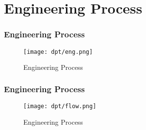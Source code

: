 \section{Engineering Process}

\begin{frame}
    \frametitle{Engineering Process}
    \begin{figure}
        \centering
        \texttt{[image: dpt/eng.png]} %
        \caption{Engineering Process}
    \end{figure}
\end{frame}

\begin{frame}
    \frametitle{Engineering Process}
    \begin{figure}
        \centering
        \texttt{[image: dpt/flow.png]} %
        \caption{Engineering Process}
    \end{figure}
\end{frame}